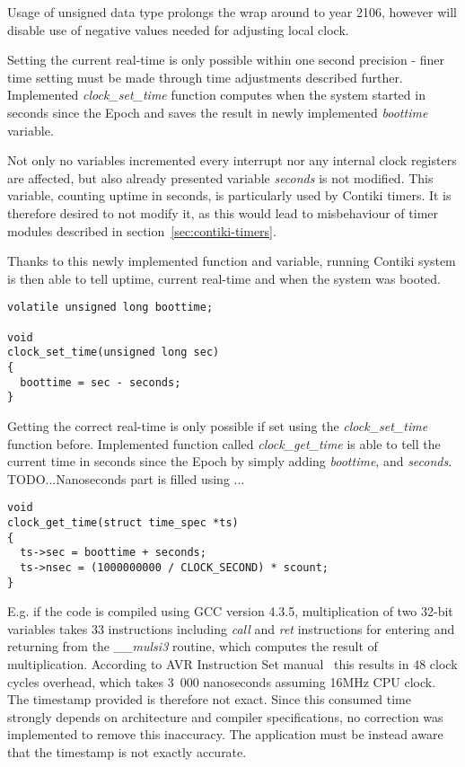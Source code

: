 Usage of unsigned data type prolongs the wrap around to year 2106,
however will disable use of negative values needed for adjusting local clock.

Setting the current real-time is only possible within one second precision -
finer time setting must be made through time adjustments described further.
Implemented {\it{clock\_set\_time}} function computes when the system started
in seconds since the Epoch and saves the result in newly implemented {\it{boottime}} variable.

Not only no variables incremented every interrupt nor any internal clock registers
are affected, but also already presented variable {\it{seconds}} is not modified.
This variable, counting uptime in seconds,
is particularly used by Contiki timers.
It is therefore desired to not modify it, as this would lead to misbehaviour of timer modules
described in section~\ref{sec:contiki-timers}.

Thanks to this newly implemented function and variable,
running Contiki system is then able to tell uptime, current real-time and
when the system was booted.
\begin{lstlisting}
volatile unsigned long boottime;

void
clock_set_time(unsigned long sec)
{
  boottime = sec - seconds;
}
\end{lstlisting}

Getting the correct real-time is only possible if set using
the {\it{clock\_set\_time}} function before.
Implemented function called {\it{clock\_get\_time}} is able to tell the
current time in seconds since the Epoch by simply adding {\it{boottime}},
and {\it{seconds}}.
TODO...Nanoseconds part is filled using ...
\begin{lstlisting}
void
clock_get_time(struct time_spec *ts)
{
  ts->sec = boottime + seconds;
  ts->nsec = (1000000000 / CLOCK_SECOND) * scount;
}
\end{lstlisting}


E.g. if the code is compiled using GCC version 4.3.5,
multiplication of two 32-bit variables takes 33 instructions including {\it{call}} and {\it{ret}}
instructions for entering and returning from the {\it{\_\_mulsi3}} routine, which computes
the result of multiplication.
According to AVR Instruction Set manual~\cite{avr-instruction-set} this results in 48 clock cycles overhead,
which takes 3~000 nanoseconds assuming 16MHz CPU clock.
The timestamp provided is therefore not exact.
Since this consumed time strongly depends on architecture and compiler specifications,
no correction was implemented to remove this inaccuracy.
The application must be instead aware that the timestamp is not exactly accurate.
